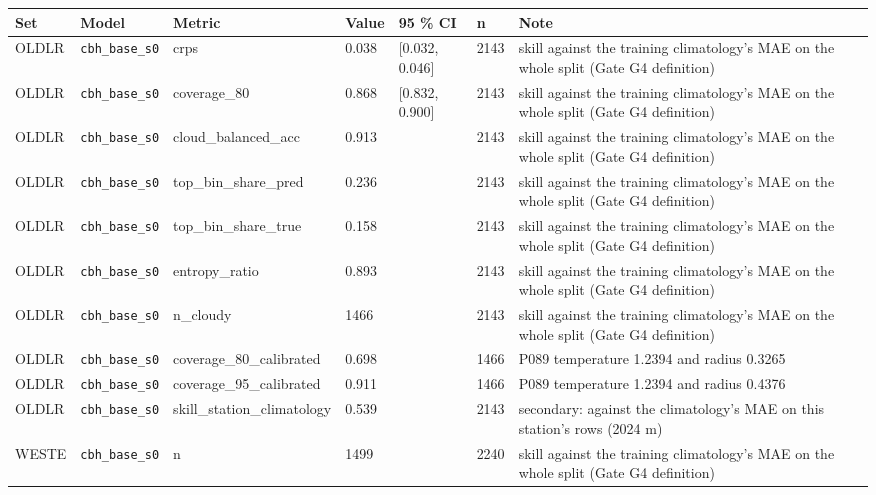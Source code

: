 \begin{center}{\scriptsize\setlength{\tabcolsep}{3pt}
\begin{tabular}{lp{2.4cm}llllp{7.3cm}}
\toprule
Set & Model & Metric & Value & 95 \% CI & n & Note \\
\midrule
OLDLR & \texttt{cbh\_\allowbreak{}base\_\allowbreak{}s0} & crps & 0.038 & [0.032, 0.046] & 2143 & skill against the training climatology's MAE on the whole split (Gate G4 definition) \\
OLDLR & \texttt{cbh\_\allowbreak{}base\_\allowbreak{}s0} & coverage\_80 & 0.868 & [0.832, 0.900] & 2143 & skill against the training climatology's MAE on the whole split (Gate G4 definition) \\
OLDLR & \texttt{cbh\_\allowbreak{}base\_\allowbreak{}s0} & cloud\_balanced\_acc & 0.913 &  & 2143 & skill against the training climatology's MAE on the whole split (Gate G4 definition) \\
OLDLR & \texttt{cbh\_\allowbreak{}base\_\allowbreak{}s0} & top\_bin\_share\_pred & 0.236 &  & 2143 & skill against the training climatology's MAE on the whole split (Gate G4 definition) \\
OLDLR & \texttt{cbh\_\allowbreak{}base\_\allowbreak{}s0} & top\_bin\_share\_true & 0.158 &  & 2143 & skill against the training climatology's MAE on the whole split (Gate G4 definition) \\
OLDLR & \texttt{cbh\_\allowbreak{}base\_\allowbreak{}s0} & entropy\_ratio & 0.893 &  & 2143 & skill against the training climatology's MAE on the whole split (Gate G4 definition) \\
OLDLR & \texttt{cbh\_\allowbreak{}base\_\allowbreak{}s0} & n\_cloudy & 1466 &  & 2143 & skill against the training climatology's MAE on the whole split (Gate G4 definition) \\
OLDLR & \texttt{cbh\_\allowbreak{}base\_\allowbreak{}s0} & coverage\_80\_calibrated & 0.698 &  & 1466 & P089 temperature 1.2394 and radius 0.3265 \\
OLDLR & \texttt{cbh\_\allowbreak{}base\_\allowbreak{}s0} & coverage\_95\_calibrated & 0.911 &  & 1466 & P089 temperature 1.2394 and radius 0.4376 \\
OLDLR & \texttt{cbh\_\allowbreak{}base\_\allowbreak{}s0} & skill\_station\_climatology & 0.539 &  & 2143 & secondary: against the climatology's MAE on this station's rows (2024 m) \\
WESTE & \texttt{cbh\_\allowbreak{}base\_\allowbreak{}s0} & n & 1499 &  & 2240 & skill against the training climatology's MAE on the whole split (Gate G4 definition) \\

\end{tabular}}
\end{center}
